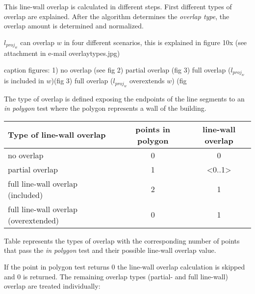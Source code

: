 \documentclass[10pt]{article}
\begin{document}
	This line-wall overlap is calculated in different steps.
	First different types of overlap are explained. After the algorithm
	determines the \emph{overlap type}, the overlap amount is determined and
	normalized.

	$l_{proj_w}$ can overlap $w$ in four different scenarios, this is explained
	in figure 10x (see attachment in e-mail overlaytypes.jpg) %


	caption figures:
		1) no overlap (see fig %
		2) partial overlap (fig %
		3) full overlap ($l_{proj_w}$ is included in $w$)(fig %
		3) full overlap ($l_{proj_w}$ overextends $w$) (fig %

	The type of overlap is defined exposing the endpoints of the line
	segments to an \emph{in polygon} test where the polygon represents a 
	wall of the building.
	\begin{tabular}{|l||c|c|}
	\hline
	Type of line-wall overlap 			&	points in polygon 			& line-wall overlap \\
	\hline
	\hline
	no overlap					&	0					& 0		\\
	\hline
	partial overlap 				&	1					& <0..1>	\\
	\hline
	full line-wall overlap (included)		&	2					& 1		\\
	\hline
	full line-wall overlap (overextended)		&  	0					& 1 		\\
	\hline
	\end{tabular}

	Table %
	represents the types of overlap with the corresponding number of points
	that pass the \emph{in polygon} test and their possible line-wall overlap
	value. 

	If the point in polygon test returns 0 the line-wall overlap calculation
	is skipped and 0 is returned. The remaining overlap types (partial- and full
	line-wall) overlap are treated individually:\\
\end{document}
